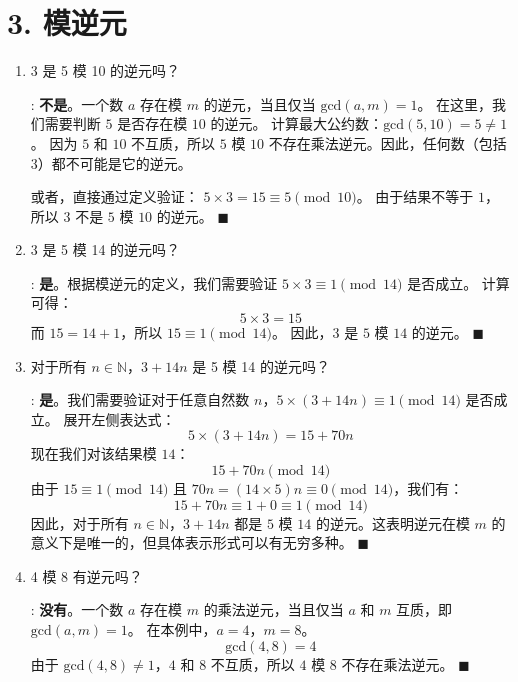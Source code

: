 \documentclass[11pt]{article}
\newenvironment{qparts}{\begin{enumerate}[{(}a{)}]}{\end{enumerate}}
\def\endproofmark{$\blacksquare$}
\newenvironment{proof}{\par\noindent{\bf 证明}:}{\endproofmark\smallskip}
\begin{document}
\newpage

\section*{3. 模逆元}
\begin{qparts}
\item 3 是 5 模 10 的逆元吗？

\begin{proof}
\textbf{不是}。一个数 $a$ 存在模 $m$ 的逆元，当且仅当 $\text{gcd}(a, m) = 1$。
在这里，我们需要判断 $5$ 是否存在模 $10$ 的逆元。
计算最大公约数：$\text{gcd}(5, 10) = 5 \neq 1$。
因为 $5$ 和 $10$ 不互质，所以 $5$ 模 $10$ 不存在乘法逆元。因此，任何数（包括 $3$）都不可能是它的逆元。

或者，直接通过定义验证：
$5 \times 3 = 15 \equiv 5 \pmod{10}$。
由于结果不等于 $1$，所以 $3$ 不是 $5$ 模 $10$ 的逆元。
\end{proof}

\item 3 是 5 模 14 的逆元吗？

\begin{proof}
\textbf{是}。根据模逆元的定义，我们需要验证 $5 \times 3 \equiv 1 \pmod{14}$ 是否成立。
计算可得：
\[ 5 \times 3 = 15 \]
而 $15 = 14 + 1$，所以 $15 \equiv 1 \pmod{14}$。
因此，$3$ 是 $5$ 模 $14$ 的逆元。
\end{proof}

\item 对于所有 $n\in\mathbb{N}$，$3+14n$ 是 5 模 14 的逆元吗？

\begin{proof}
\textbf{是}。我们需要验证对于任意自然数 $n$，$5 \times (3+14n) \equiv 1 \pmod{14}$ 是否成立。
展开左侧表达式：
\[ 5 \times (3+14n) = 15 + 70n \]
现在我们对该结果模 $14$：
\[ 15 + 70n \pmod{14} \]
由于 $15 \equiv 1 \pmod{14}$ 且 $70n = (14 \times 5)n \equiv 0 \pmod{14}$，我们有：
\[ 15 + 70n \equiv 1 + 0 \equiv 1 \pmod{14} \]
因此，对于所有 $n\in\mathbb{N}$，$3+14n$ 都是 $5$ 模 $14$ 的逆元。这表明逆元在模 $m$ 的意义下是唯一的，但具体表示形式可以有无穷多种。
\end{proof}

\item 4 模 8 有逆元吗？

\begin{proof}
\textbf{没有}。一个数 $a$ 存在模 $m$ 的乘法逆元，当且仅当 $a$ 和 $m$ 互质，即 $\text{gcd}(a, m) = 1$。
在本例中，$a=4$，$m=8$。
\[ \text{gcd}(4, 8) = 4 \]
由于 $\text{gcd}(4, 8) \neq 1$，$4$ 和 $8$ 不互质，所以 $4$ 模 $8$ 不存在乘法逆元。
\end{proof}


\end{qparts}
\end{document}
